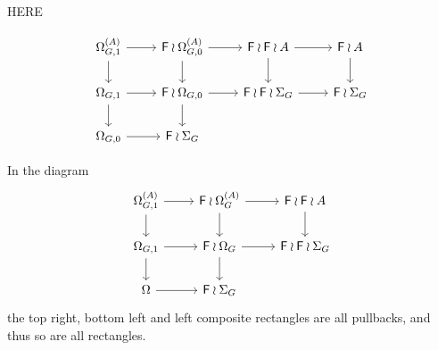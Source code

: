 \documentclass[a4paper,10pt]{article}%
\begin{document}
{\color{red} HERE}

\[
\begin{tikzcd}
	\Omega^{(A)}_{G,1} \ar{r} \ar{d}& 
	\Fin \wr \Omega^{(A)}_{G,0} \ar{r} \ar{d}&
	\Fin \wr \Fin \wr A  \ar{d} \ar{r} &
	\Fin \wr A \ar{d}
\\
	\Omega_{G,1} \ar{r} \ar{d} &
	\Fin \wr \Omega_{G,0} \ar{r} \ar{d} &
	\Fin \wr \Fin \wr \Sigma_G \ar{r} &
	\Fin \wr \Sigma_G
\\
	\Omega_{G,0} \ar{r} &
	\Fin \wr \Sigma_G
\end{tikzcd}
\]

\begin{remark}
In the diagram
\[
\begin{tikzcd}
	\Omega^{(A)}_{G,1} \ar{r} \ar{d}& 
	\Fin \wr \Omega^{(A)}_G \ar{r} \ar{d}&
	\Fin \wr \Fin \wr A  \ar{d}
\\
	\Omega_{G,1} \ar{r} \ar{d} &
	\Fin \wr \Omega_G \ar{r} \ar{d} &
	\Fin \wr \Fin \wr \Sigma_G
\\
	\Omega \ar{r} &
	\Fin \wr \Sigma_G
\end{tikzcd}
\]
the top right, bottom left and left composite rectangles are all pullbacks, and thus so are all rectangles.
\end{remark}
\end{document}

